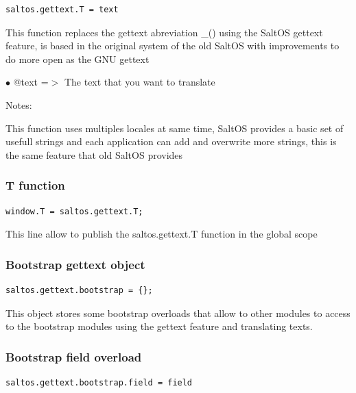\documentclass[a4paper]{article}
\begin{document}
\begin{lstlisting}
saltos.gettext.T = text
\end{lstlisting}

This function replaces the gettext abreviation \_() using the SaltOS gettext
feature, is based in the original system of the old SaltOS with improvements
to do more open as the GNU gettext

\begin{compactitem}
\item[\color{myblue}$\bullet$] @text =$>$ The text that you want to translate
\end{compactitem}

Notes:

This function uses multiples locales at same time, SaltOS provides a basic set of
usefull strings and each application can add and overwrite more strings, this is
the same feature that old SaltOS provides

\hypertarget{toc242}{}
\subsubsection{T function}

\begin{lstlisting}
window.T = saltos.gettext.T;
\end{lstlisting}

This line allow to publish the saltos.gettext.T function in the global scope

\hypertarget{toc243}{}
\subsubsection{Bootstrap gettext object}

\begin{lstlisting}
saltos.gettext.bootstrap = {};
\end{lstlisting}

This object stores some bootstrap overloads that allow to other modules to
access to the bootstrap modules using the gettext feature and translating
texts.

\hypertarget{toc244}{}
\subsubsection{Bootstrap field overload}

\begin{lstlisting}
saltos.gettext.bootstrap.field = field
\end{lstlisting}
\end{document}
